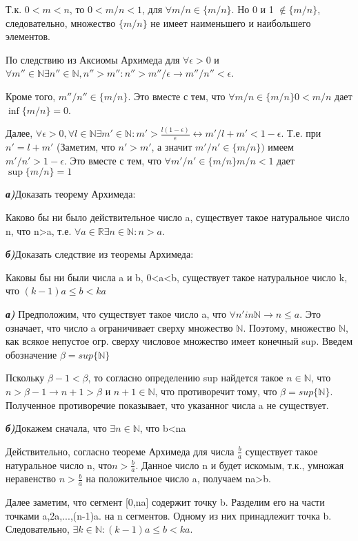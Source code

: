 \documentclass[10pt]{article}
\begin{document}
\begin{solution}
Т.к. $0<m<n$, то $0<m/n<1$, для $\forall m/n \in \{m/n\}$. Но 0 и 1 $\notin \{m/n\}$, следовательно, множество $\{m/n\}$ не имеет наименьшего и наибольшего элементов.

По следствию из Аксиомы Архимеда для $\forall \epsilon >0$ и $\forall m'' \in \mathbb{N} \exists n'' \in \mathbb{N} , n''>m'': n''>m''/\epsilon \rightarrow m''/n''<\epsilon$.

Кроме того, $m''/n'' \in \{m/n\}$. Это вместе с тем, что $\forall m/n \in \{m/n\} 0<m/n$ дает $\inf\{m/n\}=0$. 

Далее, $\forall \epsilon >0, \forall l \in \mathbb{N} \exists m' \in \mathbb{N}: m'> \frac{l(1-\epsilon)}{\epsilon} \leftrightarrow m'/{l+m'} < 1 - \epsilon$. Т.е. при $n'=l+m'$ (Заметим, что $n'>m'$, а значит $m'/n' \in \{m/n\})$ имеем $ m'/n' > 1- \epsilon$. Это вместе с тем, что 
$\forall m'/n' \in \{m/n\}  m/n<1$ дает $\sup\{m/n\}=1$
\end{solution}


\begin{problem}
\emph{\textbf{а)}}Доказать теорему Архимеда:

Каково бы ни было действительное число a, существует такое натуральное число n, что n>a, т.е. $\forall a \in \mathbb{R} \exists n \in \mathbb{N}: n>a$.

\emph{\textbf{б)}}Доказать следствие из теоремы Архимеда:

Каковы бы ни были числа a и b, 0<a<b, существует такое натуральное число k, что $(k-1)a\leq b<ka$
\end{problem}

\begin{solution}
\emph{\textbf{а)}} Предположим, что существует такое число a, что $\forall n 'in \mathbb{N} \rightarrow n \leq a$. Это означает, что число a ограничивает сверху множество $\mathbb{N}$. Поэтому, множество $\mathbb{N}$, как всякое непустое огр. сверху числовое множество имеет конечный sup. Введем обозначение $\beta = sup\{\mathbb{N}\}$

Пскольку $\beta-1 <\beta$, то согласно определению sup найдется такое $n\in\mathbb{N}$, что $n>\beta -1 \rightarrow n+1>\beta$ и $n+1 \in \mathbb{N}$, что противоречит тому, что $\beta = sup\{\mathbb{N}\}$. Полученное противоречие показывает, что указанног числа a не существует.

\emph{\textbf{б)}}Докажем сначала, что $\exists n \in \mathbb{N}$, что b<na

Действительно, согласно теореме Архимеда для числа $\frac{b}{a}$ существует такое натуральное число n, что$ n>\frac{b}{a}$. Данное число n и будет искомым, т.к., умножая неравенство $n>\frac{b}{a}$ на положительное число a, получаем na>b.

Далее заметим, что сегмент [0,na] содержит точку b. Разделим его на части точками a,2a,...,(n-1)a. на n сегментов. Одному из них принадлежит точка b. Следовательно, $\exists k \in \mathbb{N}: (k-1)a\leq b <ka$.
\end{solution}
\end{document}

